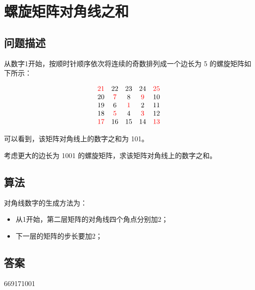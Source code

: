 \section{螺旋矩阵对角线之和}
\subsection{问题描述}
\begin{tcolorbox}

	从数字1开始，按顺时针顺序依次将连续的奇数排列成一个边长为 5 的螺旋矩阵如下所示：

	\[
		\begin{matrix}
			\textcolor{red}{21} & 22      & 23      & 24      & \textcolor{red}{25} \\
			20       & \textcolor{red}{7} & 8       & \textcolor{red}{9} & 10       \\
			19       & 6       & \textcolor{red}{1} & 2       & 11       \\
			18       & \textcolor{red}{5} & 4       & \textcolor{red}{3} & 12       \\
			\textcolor{red}{17} & 16      & 15      & 14      & \textcolor{red}{13}
		\end{matrix}
	\]

	可以看到，该矩阵对角线上的数字之和为 101。

	考虑更大的边长为 1001 的螺旋矩阵，求该矩阵对角线上的数字之和。
\end{tcolorbox}

\subsection{算法}
对角线数字的生成方法为：
\begin{itemize}
	\item 从1开始，第二层矩阵的对角线四个角点分别加2；
	\item 下一层的矩阵的步长要加2；
\end{itemize}

\subsection{答案}
669171001
